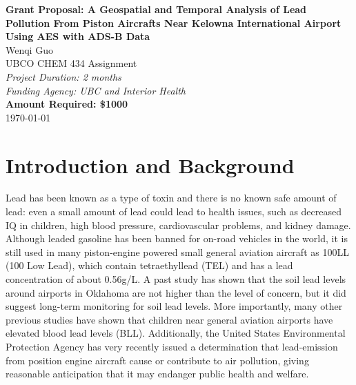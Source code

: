 \documentclass[12pt]{article}
\begin{document}
\begin{center}
    \Large{\textbf{Grant Proposal: A Geospatial and Temporal Analysis of Lead Pollution From Piston Aircrafts Near Kelowna International Airport Using AES with ADS-B Data}}\\
    \vspace{1cm}
    \large{Wenqi Guo}\\
    \vspace{0.5cm}
    \large{UBCO CHEM 434 Assignment}\\
    \vspace{0.5cm}
    \textit{Project Duration: 2 months}\\
    \vspace{0.5cm}
    \textit{Funding Agency: UBC and Interior Health}\\
    \vspace{0.5cm}
    \textbf{Amount Required: \$1000}\\
    \vspace{1cm}
    \vspace{1cm}
    \today
\end{center}
\newpage

\section{Introduction and Background}
Lead has been known as a type of toxin and there is no known safe amount of lead: even a small amount of lead could lead to health issues, such as decreased IQ in children, high blood pressure, cardiovascular problems, and kidney damage. \cite{world_health_organization_lead_2023} Although leaded gasoline has been banned for on-road vehicles in the world, it is still used in many piston-engine powered small general aviation aircraft as 100LL (100 Low Lead), which contain tetraethyllead (TEL) and has a lead concentration of about 0.56g/L. 
\cite{noauthor_safety_2021} A past study has shown that the soil lead levels around airports in Oklahoma are not higher than the level of concern, but it did suggest long-term monitoring for soil lead levels. \cite{mccumber_geospatial_2017} More importantly, many other previous studies have shown that children near general aviation airports have elevated blood lead levels (BLL). \cite{miranda_geospatial_2011} \cite{zahran_leaded_2023} \cite{mills_lead_2022} \cite{zahran_effect_2017} Additionally, the United States Environmental Protection Agency has very recently issued a determination that lead-emission from position engine aircraft cause or contribute to air pollution, giving reasonable anticipation that it may endanger public health and welfare. \cite{us_epa_epa_2023}
\end{document}
